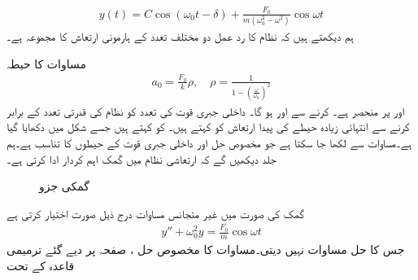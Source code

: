 \begin{align}\label{مساوات_سادہ_دو_بلا_تقصیر_حل_ب}
y(t)=C\cos(\omega_0 t-\delta)+\frac{F_0}{m(\omega_0^2-\omega^2)}\cos \omega t
\end{align}
ہم دیکھتے ہیں کہ نظام کا رد عمل دو مختلف تعدد کے ہارمونی ارتعاش کا مجموعہ ہے۔

مساوات  کا حیطہ
\begin{align}\label{مساوات_سادہ_دو_بلا_تقصیر_حل_پ}
a_0=\frac{F_0}{k} \rho, \quad \rho=\frac{1}{1-\left(\frac{\omega}{\omega_0}\right)^2}
\end{align}
 اور  پر منحصر ہے۔  کرنے سے  اور  ہو گا۔ داخلی جبری قوت کی تعدد کو نظام کی قدرتی تعدد کے برابر  کرنے سے انتہائی زیادہ حیطے کی پیدا ارتعاش  کو  کہتے ہیں۔  کو  کہتے ہیں جسے شکل  میں دکھایا گیا ہے۔مساوات  سے  لکھا جا سکتا ہے جو مخصوص حل  اور داخلی جبری قوت کے حیطوں کا تناسب ہے۔ہم جلد دیکھیں گے کہ ارتعاشی نظام میں گمک اہم کردار ادا کرتی ہے۔
\begin{figure}
\centering
{}
\caption{گمکی جزو }
\label{شکل_سادہ_دو_گمکی_جزو_بالمقابل_تعدد}
\end{figure}
گمک کی صورت میں غیر متجانس مساوات  درج ذیل صورت اختیار کرتی ہے
 \begin{align}\label{مساوات_سادہ_دو_بلا_تقصیر_حل_ت}
y''+\omega_0^2 y=\frac{F_0}{m} \cos \omega t
\end{align} 
جس کا حل مساوات  نہیں دیتی۔مساوات  کا مخصوص حل ،  صفحہ  پر دیے گئے ترمیمی قاعدہ کے تحت
